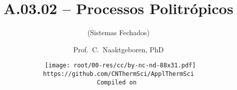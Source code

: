 \makeatletter
\immediate{} %
\makeatother


\title{A.03.02 -- Processos Politrópicos}
\subtitle{(Sistemas Fechados)}
\author{Prof.~C.~Naaktgeboren, PhD}
\date{{\scriptsize\tt%
    \texttt{[image: root/00-res/cc/by-nc-nd-88x31.pdf]}\\[\smallskipamount]
    https://github.com/CNThermSci/ApplThermSci\\
    Compiled on 
}}

\logo{%
    \parbox{158mm}{%
        \texttt{[image: root/00-res/UTFPR/UTFPR-logo-A.pdf]}\hfill%
        \texttt{[image: root/00-res/logo/CNThermSci-logo-A.pdf]}%
}} %
\frame{\titlepage}


